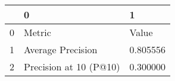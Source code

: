 \begin{tabular}{lll}
\toprule
 & 0 & 1 \\
\midrule
0 & Metric & Value \\
1 & Average Precision & 0.805556 \\
2 & Precision at 10 (P@10) & 0.300000 \\
\bottomrule
\end{tabular}
